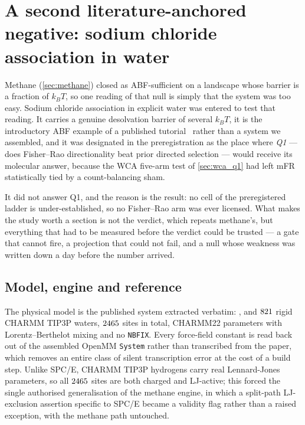 \section{A second literature-anchored negative: sodium chloride association in water}
\label{sec:nacl}

Methane (\cref{sec:methane}) closed as ABF-sufficient on a landscape whose barrier is a fraction
of $k_BT$, so one reading of that null is simply that the system was too easy. Sodium chloride
association in explicit water was entered to test that reading. It carries a genuine desolvation
barrier of several $k_BT$, it is the introductory ABF example of a published
tutorial~\citep{Talmazan2025} rather than a system we assembled, and it was designated in the
preregistration as the place where \emph{Q1} --- does Fisher--Rao directionality beat prior
directed selection --- would receive its molecular answer, because the WCA five-arm test of
\cref{sec:wca_q1} had left mFR statistically tied by a count-balancing sham.

It did not answer Q1, and the reason is the result: no cell of the preregistered ladder is
under-established, so no Fisher--Rao arm was ever licensed. What makes the study worth a section
is not the verdict, which repeats methane's, but everything that had to be measured before the
verdict could be trusted --- a gate that cannot fire, a projection that could not fail, and a
null whose weakness was written down a day before the number arrived.

\subsection{Model, engine and reference}

The physical model is the published system extracted verbatim: ,  and
$821$ rigid CHARMM TIP3P waters, $2465$ sites in total, CHARMM22 parameters with
Lorentz--Berthelot mixing and no \texttt{NBFIX}. Every force-field constant is read back out of
the assembled OpenMM \texttt{System} rather than transcribed from the paper, which removes an
entire class of silent transcription error at the cost of a build step. Unlike SPC/E, CHARMM
TIP3P hydrogens carry real Lennard-Jones parameters, so all $2465$ sites are both charged and
LJ-active; this forced the single authorised generalisation of the methane engine, in which a
split-path LJ-exclusion assertion specific to SPC/E became a validity flag rather than a raised
exception, with the methane path untouched.

